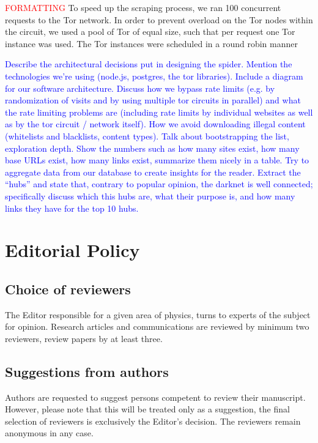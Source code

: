 \documentclass[USenglish,oneside,twocolumn]{article}
\newcommand\TODO[1]{\textcolor{red}{#1}}
\newcommand\CONTENT[1]{\textcolor{blue}{#1}}
\begin{document}

\TODO{FORMATTING}
To speed up the scraping process, we ran 100 concurrent requests to the Tor network. In order to prevent overload on the Tor nodes within the circuit, we used a pool of Tor of equal size, such that per request one Tor instance was used. The Tor instances were scheduled in a round robin manner 

\CONTENT{Describe the architectural decisions put in designing the spider. Mention the technologies we’re using (node.js, postgres, the tor libraries). Include a diagram for our software architecture. Discuss how we bypass rate limits (e.g. by randomization of visits and by using multiple tor circuits in parallel) and what the rate limiting problems are (including rate limits by individual websites as well as by the tor circuit / network itself). How we avoid downloading illegal content (whitelists and blacklists, content types). Talk about bootstrapping the list, exploration depth. Show the numbers such as how many sites exist, how many base URLs exist, how many links exist, summarize them nicely in a table. Try to aggregate data from our database to create insights for the reader. Extract the “hubs” and state that, contrary to popular opinion, the darknet is well connected; specifically discuss which this hubs are, what their purpose is, and how many links they have for the top 10 hubs.}

\section{Editorial Policy}

\subsection{Choice of reviewers}

The Editor responsible for a given area of physics, turns to experts of the subject for opinion. Research articles and communications are reviewed by minimum two reviewers, review papers by at least three.

\subsection{Suggestions from authors}

Authors are requested to suggest persons competent to review their manuscript. However, please note that this will be treated only as a suggestion, the final selection of reviewers is exclusively the Editor's decision. The reviewers remain anonymous in any case.
\end{document}
